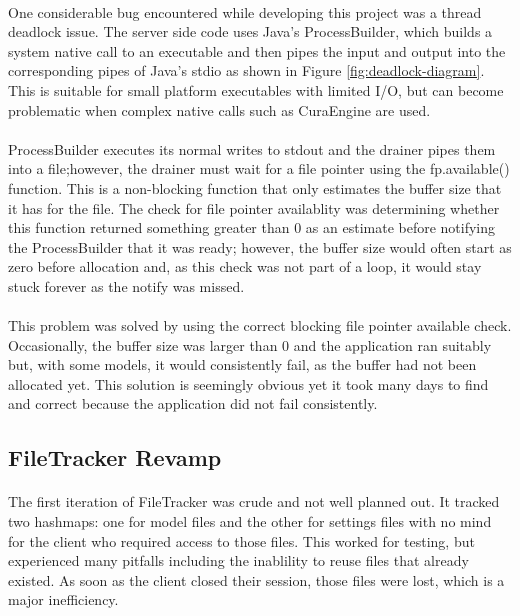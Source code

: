 \paragraph{}
One considerable bug encountered while developing this project was a thread deadlock issue. 
The server side code uses Java's ProcessBuilder, which builds a system native call to an executable and then pipes the input and output into the corresponding pipes of Java's stdio as shown in Figure \ref{fig:deadlock-diagram}.
This is suitable for small platform executables with limited I/O, but can become problematic when complex native calls such as CuraEngine are used.

\paragraph{}
ProcessBuilder executes its normal writes to stdout and the drainer pipes them into a file;however, the drainer must wait for a file pointer using the fp.available() function. 
This is a non-blocking function that only estimates the buffer size that it has for the file. 
The check for file pointer availablity was determining whether this function returned something greater than 0 as an estimate before notifying the ProcessBuilder that it was ready;
however, the buffer size would often start as zero before allocation and, as this check was not part of a loop, it would stay stuck forever as the notify was missed.

\paragraph{}
This problem was solved by using the correct blocking file pointer available check. 
Occasionally, the buffer size was larger than 0 and the application ran suitably but, with some models, it would consistently fail, as the buffer had not been allocated yet.
This solution is seemingly obvious yet it took many days to find and correct because the application did not fail consistently.

\subsection{FileTracker Revamp}
\paragraph{}
The first iteration of FileTracker was crude and not well planned out. 
It tracked two hashmaps: one for model files and the other for settings files with no mind for the client who required access to those files. 
This worked for testing, but experienced many pitfalls including the inablility to reuse files that already existed. 
As soon as the client closed their session, those files were lost, which is a major inefficiency.

